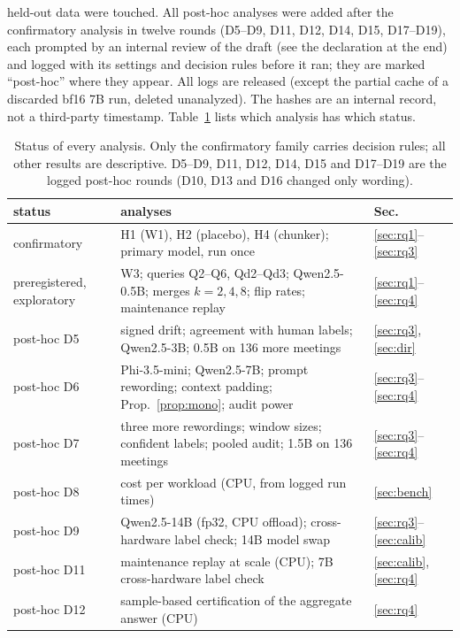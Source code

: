\documentclass[conference]{IEEEtran}
\begin{document}
held-out data were touched. All post-hoc analyses were added after the confirmatory analysis in twelve rounds (D5--D9, D11, D12, D14, D15, D17--D19), each prompted
by an internal review of the draft (see the declaration at the end) and logged with its settings and decision rules
before it ran; they are marked ``post-hoc'' where they appear. All logs are released (except the partial cache of a
discarded bf16 7B run, deleted unanalyzed). The hashes are an internal record, not a third-party timestamp.
Table~\ref{tab:status} lists which analysis has which status.
\begin{table}[t]
\centering\footnotesize
\caption{Status of every analysis. Only the confirmatory family carries decision rules; all other results are
descriptive. D5--D9, D11, D12, D14, D15 and D17--D19 are the logged post-hoc rounds (D10, D13 and D16 changed only wording).}
\label{tab:status}
\setlength{\tabcolsep}{3pt}
\begin{tabular}{@{}>{\raggedright\arraybackslash}p{}>{\raggedright\arraybackslash}p{}l@{}}
\toprule
status & analyses & Sec. \\
\midrule
confirmatory & H1 (W1), H2 (placebo), H4 (chunker); primary model, run once & \ref{sec:rq1}--\ref{sec:rq3} \\
preregistered, exploratory & W3; queries Q2--Q6, Qd2--Qd3; Qwen2.5-0.5B; merges $k=2,4,8$; flip rates; maintenance replay & \ref{sec:rq1}--\ref{sec:rq4} \\
post-hoc D5 & signed drift; agreement with human labels; Qwen2.5-3B; 0.5B on 136 more meetings & \ref{sec:rq3}, \ref{sec:dir} \\
post-hoc D6 & Phi-3.5-mini; Qwen2.5-7B; prompt rewording; context padding; Prop.~\ref{prop:mono}; audit power & \ref{sec:rq3}--\ref{sec:rq4} \\
post-hoc D7 & three more rewordings; window sizes; confident labels; pooled audit; 1.5B on 136 meetings & \ref{sec:rq3}--\ref{sec:rq4} \\
post-hoc D8 & cost per workload (CPU, from logged run times) & \ref{sec:bench} \\
post-hoc D9 & Qwen2.5-14B (fp32, CPU offload); cross-hardware label check; 14B model swap & \ref{sec:rq3}--\ref{sec:calib} \\
post-hoc D11 & maintenance replay at scale (CPU); 7B cross-hardware label check & \ref{sec:calib}, \ref{sec:rq4} \\
post-hoc D12 & sample-based certification of the aggregate answer (CPU) & \ref{sec:rq4} \\

\end{tabular}
\end{table}
\end{document}

